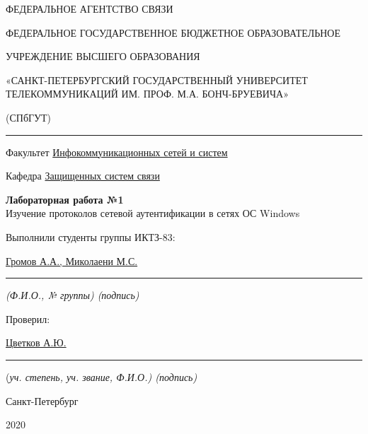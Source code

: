 \documentclass[a4paper,14pt]{extarticle}
\begin{document}
    \begin{center}
        \thispagestyle{empty}
        \begin{singlespace}
        ФЕДЕРАЛЬНОЕ АГЕНТСТВО СВЯЗИ

        ФЕДЕРАЛЬНОЕ ГОСУДАРСТВЕННОЕ БЮДЖЕТНОЕ ОБРАЗОВАТЕЛЬНОЕ

        УЧРЕЖДЕНИЕ ВЫСШЕГО ОБРАЗОВАНИЯ

        «САНКТ-ПЕТЕРБУРГСКИЙ ГОСУДАРСТВЕННЫЙ УНИВЕРСИТЕТ ТЕЛЕКОММУНИКАЦИЙ ИМ. ПРОФ. М.А. БОНЧ-БРУЕВИЧА»

        (СПбГУТ)
        \end{singlespace}
        \vspace{-1ex}
        \rule{\textwidth}{0.4pt}
        \vspace{-5ex}

        Факультет \underline{Инфокоммуникационных сетей и систем}

        Кафедра \underline{Защищенных систем связи}
        \vspace{10ex}

        \textbf{Лабораторная работа №1}\\
        Изучение протоколов сетевой аутентификации в сетях ОС Windows


    \end{center}
    \vspace{4ex}
    \begin{flushright}
    \parbox{10 cm}{
    \begin{flushleft}
        Выполнили студенты группы ИКТЗ-83:

        \underline{Громов А.А., Миколаени М.С.} \hfill \rule[-0.85ex]{0.1\textwidth}{0.6pt}

        \footnotesize \textit{ (Ф.И.О., № группы) \hfill (подпись)} \normalsize

        Проверил:

        \underline{Цветков А.Ю.} \hfill \rule[-0.85ex]{0.1\textwidth}{0.6pt}

        (\footnotesize \textit{уч. степень, уч. звание, Ф.И.О.) \hfill (подпись)} \normalsize

    \end{flushleft}
    }
    \end{flushright}
    \begin{center}
        \vfill
        Санкт-Петербург

        2020

    \end{center}
    \newpage
\end{document}
